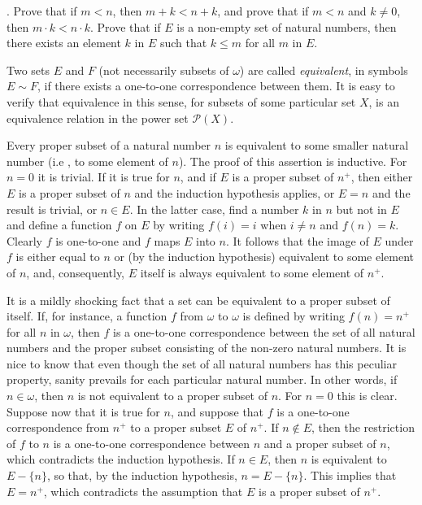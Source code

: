 \begin{exercise}. Prove that if $m < n$, then $m + k < n + k$, and prove that if $m < n$ and $k \neq 0$, then $m \cdot k <n \cdot k$. Prove that if $E$ is a non-empty set of natural numbers, then there exists an element $k$ in $E$ such that $k \le m$ for all $m$ in $E$. 
\end{exercise}

Two sets $E$ and $F$ (not necessarily subsets of $\omega$) are called \textit{equivalent}, in symbols $E \sim F$, if there exists a one-to-one correspondence between them. It is easy to verify that equivalence in this sense, for subsets of some particular set $X$, is an equivalence relation in the power set $\mathcal{P}(X)$.

Every proper subset of a natural number $n$ is equivalent to some smaller natural number (i.e , to some element of $n$). The proof of this assertion is inductive. For $n = 0$ it is trivial. If it is true for $n$, and if $E$ is a proper subset of $n^{+}$, then either $E$ is a proper subset of $n$ and the induction hypothesis applies, or $E = n$ and the result is trivial, or $n \in E$. In the latter case, find a number $k$ in $n$ but not in $E$ and define a function $f$ on $E$ by writing $f(i) = i$ when $i \neq n$ and $f(n) = k$. Clearly $f$ is one-to-one and $f$ maps $E$ into $n$. It follows that the image of $E$ under $f$ is either equal to $n$ or (by the induction hypothesis) equivalent to some element of $n$, and, consequently, $E$ itself is always equivalent to some element of $n^{+}$. 

It is a mildly shocking fact that a set can be equivalent to a proper subset of itself. If, for instance, a function $f$ from $\omega$ to $\omega$ is defined by writing $f(n) = n^{+}$ for all $n$ in $\omega$, then $f$ is a one-to-one correspondence between the set of all natural numbers and the proper subset consisting of the non-zero natural numbers. It is nice to know that even though the set of all natural numbers has this peculiar property, sanity prevails for each particular natural number. In other words, if $n \in \omega$, then $n$ is not equivalent to a proper subset of $n$. For $n = 0$ this is clear. Suppose now that it is true for $n$, and suppose that $f$ is a one-to-one correspondence from $n^{+}$ to a proper subset $E$ of $n^{+}$. If $n \notin E$, then the restriction of $f$ to $n$ is a one-to-one correspondence between $n$ and a proper subset of $n$, which contradicts the induction hypothesis. If $n \in E$, then $n$ is equivalent to $E - \{ n \}$, so that, by the induction hypothesis, $n = E - \{ n \}$. This implies that $E = n^{+}$, which contradicts the assumption that $E$ is a proper subset of $n^{+}$. 

